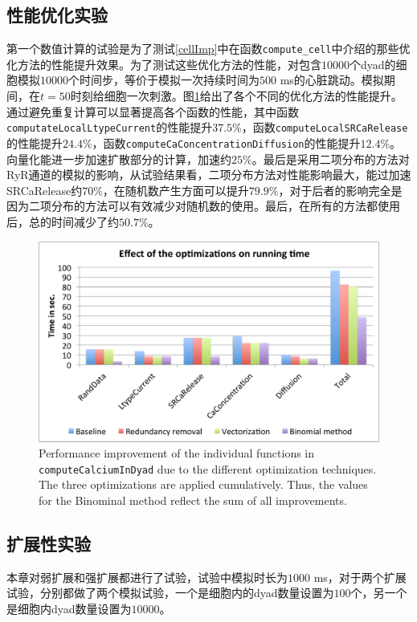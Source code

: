 \subsection{性能优化实验}
第一个数值计算的试验是为了测试\ref{cellImp}中在函数{\tt compute\_cell}中介绍的那些优化方法的性能提升效果。为了测试这些优化方法的性能，对包含$10000$个dyad的细胞模拟$10000$个时间步，等价于模拟一次持续时间为$500$ ms的心脏跳动。模拟期间，在$t=50$时刻给细胞一次刺激。图\ref{fig:optimizations}给出了各个不同的优化方法的性能提升。通过避免重复计算可以显著提高各个函数的性能，其中函数{\tt computateLocalLtypeCurrent}的性能提升$37.5\%$，函数{\tt computeLocalSRCaRelease}的性能提升$24.4\%$，函数{\tt computeCaConcentrationDiffusion}的性能提升$12.4\%$。向量化能进一步加速扩散部分的计算，加速约$25\%$。最后是采用二项分布的方法对RyR通道的模拟的影响，从试验结果看，二项分布方法对性能影响最大，能过加速SRCaRelease约$70\%$，在随机数产生方面可以提升$79.9\%$，对于后者的影响完全是因为二项分布的方法可以有效减少对随机数的使用。最后，在所有的方法都使用后，总的时间减少了约$50.7\%$。

\begin{figure}[htb]
\center
\includegraphics[width=\textwidth]{figs/optimization.pdf}
\caption{Performance improvement of the individual functions in {\tt computeCalciumInDyad} due to the different optimization techniques. The three optimizations are applied cumulatively. Thus, the values for the Binominal method reflect the sum of all improvements.}
\label{fig:optimizations}
\end{figure} 

\subsection{扩展性实验}
本章对弱扩展和强扩展都进行了试验，试验中模拟时长为$1000$ ms，对于两个扩展试验，分别都做了两个模拟试验，一个是细胞内的dyad数量设置为$100$个，另一个是细胞内dyad数量设置为$10000$。

